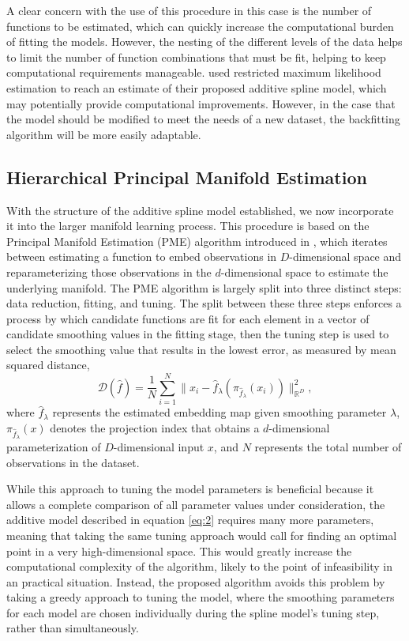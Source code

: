 \documentclass[11pt,reqno]{article}
\theoremstyle{definition}
\begin{document}
A clear concern with the use of this procedure in this case is the number of functions to be estimated, which can quickly increase the computational burden of fitting the models. However, the nesting of the different levels of the data helps to limit the number of function combinations that must be fit, helping to keep computational requirements manageable. \cite{brumbackSmoothingSplineModels1998} used restricted maximum likelihood estimation to reach an estimate of their proposed additive spline model, which may potentially provide computational improvements. However, in the case that the model should be modified to meet the needs of a new dataset, the backfitting algorithm will be more easily adaptable. 

\subsection{Hierarchical Principal Manifold Estimation}

With the structure of the additive spline model established, we now incorporate it into the larger manifold learning process. This procedure is based on the Principal Manifold Estimation (PME) algorithm introduced in \cite{mengPrincipalManifoldEstimation2021}, which iterates between estimating a function to embed observations in $D$-dimensional space and reparameterizing those observations in the $d$-dimensional space to estimate the underlying manifold. The PME algorithm is largely split into three distinct steps: data reduction, fitting, and tuning. The split between these three steps enforces a process by which candidate functions are fit for each element in a vector of candidate smoothing values in the fitting stage, then the tuning step is used to select the smoothing value that results in the lowest error, as measured by mean squared distance,
\[%
  \mathcal{D}(\hat{f}) = \frac{1}{N}\sum_{i=1}^{N}\|x_i - \hat{f}_\lambda\left(\pi_{\hat{f}_\lambda}(x_i)\right)\|_{\mathbb{R}^{D}}^2
,\]%
where $\hat{f}_\lambda$ represents the estimated embedding map given smoothing parameter $\lambda$, $\pi_{\hat{f}_\lambda}(x)$ denotes the projection index that obtains a $d$-dimensional parameterization of $D$-dimensional input $x$, and $N$ represents the total number of observations in the dataset.

While this approach to tuning the model parameters is beneficial because it allows a complete comparison of all parameter values under consideration, the additive model described in equation \ref{eq:2} requires many more parameters, meaning that taking the same tuning approach would call for finding an optimal point in a very high-dimensional space. This would greatly increase the computational complexity of the algorithm, likely to the point of infeasibility in an practical situation. Instead, the proposed algorithm avoids this problem by taking a greedy approach to tuning the model, where the smoothing parameters for each model are chosen individually during the spline model's tuning step, rather than simultaneously. 
\end{document}
